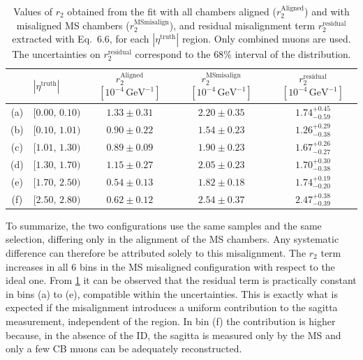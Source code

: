 \documentclass[11pt,a4paper,twoside,openright]{report}
\begin{document}
\begin{table}[htbp]
  \centering
  \begin{tabular}{clccc}
    \toprule
    & $|\eta^{\mathrm{truth}}|$
    & $r_2^{\mathrm{Aligned}}$ $[10^{-4}\,\mathrm{GeV}^{-1}]$
    & $r_2^{\mathrm{MSmisalign}}$ $[10^{-4}\,\mathrm{GeV}^{-1}]$
    & $r_2^{\mathrm{residual}}$ $[10^{-4}\,\mathrm{GeV}^{-1}]$ \\
    \midrule
    (a) & $[0.00,\,0.10)$ & $1.33 \pm 0.31$ & $2.20 \pm 0.35$ & $1.74^{+0.45}_{-0.59}$ \\
    (b) & $[0.10,\,1.01)$ & $0.90 \pm 0.22$ & $1.54 \pm 0.23$ & $1.26^{+0.29}_{-0.38}$ \\
    (c) & $[1.01,\,1.30)$ & $0.89 \pm 0.09$ & $1.90 \pm 0.23$ & $1.67^{+0.26}_{-0.27}$ \\
    (d) & $[1.30,\,1.70)$ & $1.15 \pm 0.27$ & $2.05 \pm 0.23$ & $1.70^{+0.30}_{-0.38}$ \\
    (e) & $[1.70,\,2.50)$ & $0.54 \pm 0.13$ & $1.82 \pm 0.18$ & $1.74^{+0.19}_{-0.20}$ \\
    (f) & $[2.50,\,2.80)$ & $0.62 \pm 0.12$ & $2.54 \pm 0.37$ & $2.47^{+0.38}_{-0.39}$ \\
    \bottomrule
  \end{tabular}
    \caption{Values of $r_2$ obtained from the fit with all chambers aligned
    ($r_2^{\mathrm{Aligned}}$) and with misaligned MS chambers
    ($r_2^{\mathrm{MSmisalign}}$), and residual misalignment term
    $r_2^{\mathrm{residual}}$ extracted with Eq.~6.6,
    for each $|\eta^{\mathrm{truth}}|$ region. Only combined muons are used.
    The uncertainties on $r_2^{\mathrm{residual}}$ correspond to the $68\%$
    interval of the distribution.}
    \label{tab:result_residual}
\end{table}

\noindent To summarize, the two configurations use the same samples and the same selection, differing only in the alignment of the MS chambers. Any systematic difference can therefore be attributed solely to this misalignment. The $r_2$ term increases in all 6 bins in the MS misaligned configuration with respect to the ideal one. From \cref{tab:result_residual} it can be observed that the residual term is practically constant in bins (a) to (e), compatible within the uncertainties. This is exactly what is expected if the misalignment introduces a uniform contribution to the sagitta measurement, independent of the region. In bin (f) the contribution is higher because, in the absence of the ID, the sagitta is measured only by the MS and only a few CB muons can be adequately reconstructed.
\end{document}
